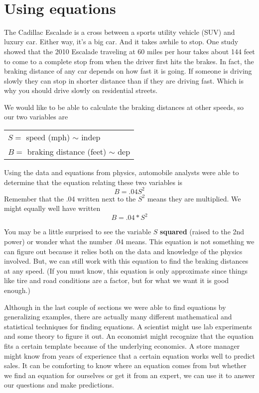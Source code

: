  ~\vspace{.1in}
 
 \section{Using equations} 

The Cadillac Escalade is a cross between a sports utility vehicle (SUV) and luxury car.  Either way, it's a big car.  And it takes awhile to stop.  One study showed that the 2010 Escalade traveling at 60 miles per hour takes about 144 feet to come to a complete stop from when the driver first hits the brakes.   In fact, the braking distance of any car depends on how fast it is going.  If someone is driving slowly they can stop in shorter distance than if they are driving fast.  Which is why you should drive slowly on residential streets.  

We would like to be able to calculate the braking distances at other speeds, so our two variables are
\begin{center}
\begin{tabular} {l} 
$S=$ speed (mph) $\sim$ indep \\
$B= $ braking distance (feet) $\sim$ dep \\ 
\end{tabular}
\end{center}
Using the data and equations from physics, automobile analysts were able to determine that the equation relating these two variables is $$B=.04S^2$$  Remember that the .04 written next to the $S^2$ means they are multiplied.  We might equally well have written $$B = .04 \ast S^2$$ 

You may be a little surprised to see the variable $S$ \textbf{squared} (raised to the 2nd power) or wonder what the number .04 means.  This equation is not something we can figure out because it relies both on the data and knowledge of the physics involved.  But, we can still work with this equation to find the braking distances at any speed.   (If you must know, this equation is only approximate since things like tire and road conditions are a factor, but for what we want it is good enough.)

Although in the last couple of sections we were able to find equations by generalizing examples, there are actually many different mathematical and statistical techniques for finding equations. A scientist might use lab experiments and some theory to figure it out.  An economist might recognize that the equation fits a certain template because of the underlying economics.  A store manager might know from years of experience that a certain equation works well to predict sales.  It can be comforting to know where an equation comes from but whether we find an equation for ourselves or get it from an expert, we can use it to answer our questions and make predictions. 

